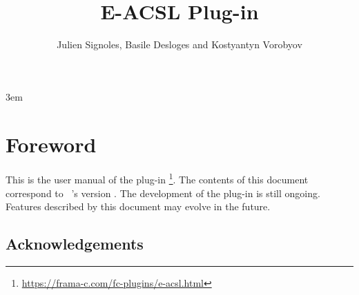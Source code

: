 \documentclass{frama-c-book}
\title{E-ACSL Plug-in}
\author{Julien Signoles, Basile Desloges and Kostyantyn Vorobyov}
\begin{document}
\sloppy
\emergencystretch 3em

\maketitle
\tableofcontents


\chapter*{Foreword}
\markright{}

This is the user manual of the \framac plug-in
\eacsl\footnote{\url{https://frama-c.com/fc-plugins/e-acsl.html}}. The contents
of this document correspond to \framac~\cite{userman,baudin21cacm}'s version
\framacversion{}. The development of the \eacsl plug-in is still ongoing.
Features described by this document may evolve in the future.

\section*{Acknowledgements}

\insertpeople







\appendix




\cleardoublepage
{}






\cleardoublepage
{}
\printindex
\end{document}
